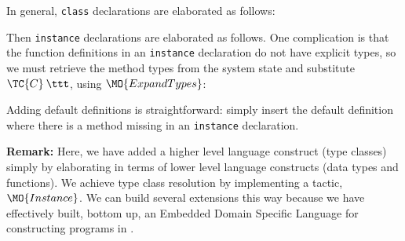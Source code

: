 \noindent
In general, \texttt{class} declarations are elaborated as follows:


\noindent
Then \texttt{instance} declarations are elaborated as follows. One complication
is that the function definitions in an \texttt{instance} declaration do not
have explicit types, so we must retrieve the method types from the system state
and substitute $\TC{C}\:\ttt$, using $\MO{ExpandTypes}$:


Adding default definitions is straightforward: simply insert the default definition where
there is a method missing in an \texttt{instance} declaration.

\textbf{Remark:} Here, we have added a higher level language construct (type
classes) simply by elaborating in terms of lower level language constructs
(data types and functions).  We achieve type class resolution by implementing a
tactic, $\MO{Instance}$.  We can build several extensions this way because we
have effectively built, bottom up, an Embedded Domain Specific Language for
constructing programs in \TT{}.

